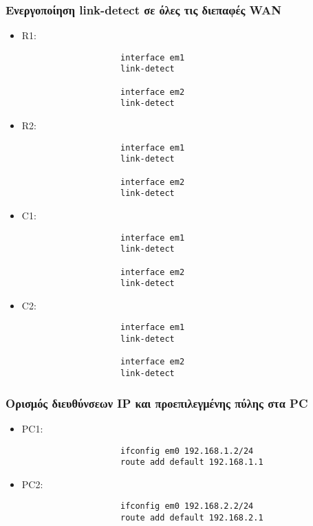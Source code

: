 \documentclass[a4paper, 12pt]{article}
\begin{document}
	\subsubsection*{Ενεργοποίηση link-detect σε όλες τις διεπαφές WAN}
		\begin{itemize}
			\item R1:
				\begin{verbatim}
					interface em1 
					link-detect
					
					interface em2 
					link-detect
				\end{verbatim}
			
			\item R2:			
				\begin{verbatim}
					interface em1 
					link-detect

					interface em2 
					link-detect
				\end{verbatim}
			
			\item C1:			
				\begin{verbatim}
					interface em1 
					link-detect
					
					interface em2 
					link-detect
				\end{verbatim}
			
			\item C2:			
				\begin{verbatim}
					interface em1 
					link-detect
					
					interface em2 
					link-detect
				\end{verbatim}
		\end{itemize}
		
		
	\subsubsection*{Ορισμός διευθύνσεων IP και προεπιλεγμένης πύλης στα PC}
		\begin{itemize}
			\item PC1:
				\begin{verbatim}
					ifconfig em0 192.168.1.2/24
					route add default 192.168.1.1
				\end{verbatim}
				
			\item PC2:
				\begin{verbatim}
					ifconfig em0 192.168.2.2/24
					route add default 192.168.2.1
				\end{verbatim}
		\end{itemize}
			
\end{document}
